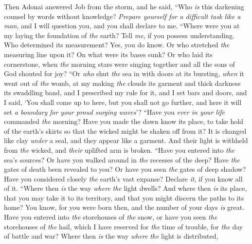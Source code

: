 \begin{biblechapter} %
 Then Adonai answered Job from the storm, and he said,
\verse “Who \textit{is} this darkening counsel 
by words without knowledge?
\verse \textit{Prepare yourself for a difficult task like a man}, 
and I will question you, and you shall declare to me.
 “Where were you at my laying the foundation of \textit{the} earth? 
Tell \textit{me}, if you possess understanding.
\verse Who determined its measurement? Yes, you do know. 
Or who stretched \textit{the} measuring line upon it?
\verse On what were its bases sunk? 
Or who laid its cornerstone,
\verse when \textit{the} morning stars were singing together 
and all the sons of God shouted for joy?
\verse “Or \textit{who} shut \textit{the} sea in with doors 
at its bursting, \textit{when} it went out of \textit{the} womb,
\verse at my making \textit{the} clouds its garment 
and thick darkness its swaddling band,
\verse and I prescribed my rule for it, 
and I set bars and doors,
\verse and I said, ‘You shall come up to here, but you shall not go further, 
and here it will set \textit{a boundary} \textit{for your proud surging waves}’?
\verse “Have you \textit{ever in your life} commanded \textit{the} morning? 
Have you made the dawn know its place,
\verse to take hold of the earth’s skirts 
so that the wicked might be shaken off from it?
\verse It is changed like clay \textit{under} a seal, 
and they appear like a garment.
\verse And their light is withheld from \textit{the} wicked, 
and \textit{their} uplifted arm is broken.
\verse “Have you entered into \textit{the} sea’s sources? 
Or have you walked around in \textit{the} recesses of the deep?
\verse Have \textit{the} gates of death been revealed to you? 
Or have you seen \textit{the} gates of deep shadow?
\verse Have you considered closely \textit{the} earth’s vast expanse? 
Declare \textit{it}, if you know all of it.
\verse “Where then \textit{is} the way \textit{where} \textit{the} light dwells? 
And where then \textit{is} its place,
\verse that you may take it to its territory, 
and that you might discern the paths to its home?
\verse You know, for you were born then, 
and the number of your days \textit{is} great.
\verse Have you entered into \textit{the} storehouses of \textit{the} snow, 
or have you seen \textit{the} storehouses of \textit{the} hail,
\verse which I have reserved for \textit{the} time of trouble, 
for \textit{the} day of battle and war?
\verse Where then \textit{is} the way \textit{where} \textit{the} light is distributed, 

\end{biblechapter}
